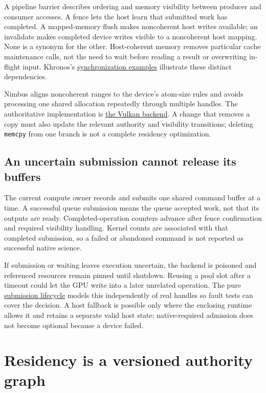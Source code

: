 A pipeline barrier describes ordering and memory visibility between producer
and consumer accesses. A fence lets the host learn that submitted work has
completed. A mapped-memory flush makes noncoherent host writes available; an
invalidate makes completed device writes visible to a noncoherent host mapping.
None is a synonym for the other. Host-coherent memory removes particular cache
maintenance calls, not the need to wait before reading a result or overwriting
in-flight input. Khronos's
\href{https://docs.vulkan.org/guide/latest/synchronization_examples.html}{synchronization examples}
illustrate these distinct dependencies.

Nimbus aligns noncoherent ranges to the device's atom-size rules and avoids
processing one shared allocation repeatedly through multiple handles.
The authoritative implementation is
\href{../vulkan/src/compute/compute_backend_vulkan.cpp}{the Vulkan backend}.
A change that removes a copy must also update the relevant authority and
visibility transitions; deleting \texttt{memcpy} from one branch is not a
complete residency optimization.



\subsection{An uncertain submission cannot release its buffers}

The current compute owner records and submits one shared command buffer at a
time. A successful queue submission means the queue accepted work, not that
its outputs are ready. Completed-operation counters advance after fence
confirmation and required visibility handling. Kernel counts are associated
with that completed submission, so a failed or abandoned command is not
reported as successful native science.

If submission or waiting leaves execution uncertain, the backend is poisoned
and referenced resources remain pinned until shutdown. Reusing a pool slot
after a timeout could let the GPU write into a later unrelated operation.
The pure \href{../vulkan/include/compute/vulkan_submission_lifecycle.hpp}{submission
lifecycle} models this independently of real handles so fault tests can cover
the decision. A host fallback is possible only where the enclosing runtime
allows it and retains a separate valid host state; native-required admission
does not become optional because a device failed.

\section{Residency is a versioned authority graph}

